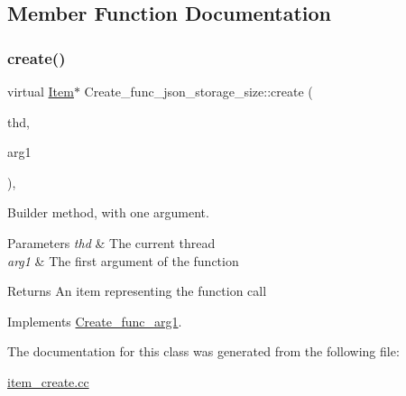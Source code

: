 \subsection{Member Function Documentation}
\mbox{\label{classCreate__func__json__storage__size_a1a72961385b5345997412b59e9550546}} 
\subsubsection{\texorpdfstring{create()}{create()}}
{\footnotesize\ttfamily virtual \mbox{\hyperlink{classItem}{Item}}$\ast$ Create\+\_\+func\+\_\+json\+\_\+storage\+\_\+size\+::create (\begin{DoxyParamCaption}\item[{T\+HD $\ast$}]{thd,  }\item[{\mbox{\hyperlink{classItem}{Item}} $\ast$}]{arg1 }\end{DoxyParamCaption})\hspace{0.3cm}{\ttfamily [inline]}, {\ttfamily [virtual]}}

Builder method, with one argument. 
\begin{DoxyParams}{Parameters}
{\em thd} & The current thread \\
\hline
{\em arg1} & The first argument of the function \\
\hline
\end{DoxyParams}
\begin{DoxyReturn}{Returns}
An item representing the function call 
\end{DoxyReturn}


Implements \mbox{\hyperlink{classCreate__func__arg1_a3e9a98f755cd82c3e762e334c955a8c9}{Create\+\_\+func\+\_\+arg1}}.



The documentation for this class was generated from the following file\+:\begin{DoxyCompactItemize}
\item 
\mbox{\hyperlink{item__create_8cc}{item\+\_\+create.\+cc}}\end{DoxyCompactItemize}

